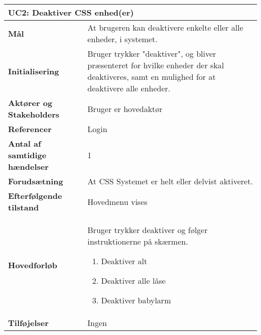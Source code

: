 \begin{table}[H] \centering
\begin{tabular}{|p{6cm}|p{8cm}|}
	\hline
\multicolumn{2}{|l|}{\textbf{UC2: Deaktiver CSS enhed(er)}} \\\hline
\textbf{Mål}	&
At brugeren kan deaktivere enkelte eller alle enheder, i systemet.
\\\hline
\textbf{Initialisering} &
Bruger trykker "deaktiver", og bliver
præsenteret for hvilke enheder der skal deaktiveres, samt en mulighed for at deaktivere alle
enheder. 
\\\hline
\textbf{Aktører og Stakeholders}	&
Bruger er hovedaktør
\\\hline
\textbf{Referencer} &
Login
\\\hline
\textbf{Antal af samtidige hændelser} &
1
\\\hline
\textbf{Forudsætning} &
At CSS Systemet er helt eller delvist aktiveret.
\\\hline
\textbf{Efterfølgende tilstand} &
Hovedmenu vises
\\\hline
\textbf{Hovedforløb}	&
Bruger trykker deaktiver og følger instruktionerne på skærmen. \newline
\begin{enumerate}
\item Deaktiver alt\newline
\item Deaktiver alle låse\newline
\item Deaktiver babylarm\newline
\end{enumerate}
\\\hline
\textbf{Tilføjelser}	&
Ingen
\\\hline
	\end{tabular}
	\label{tab:UC2} 
\end{table}